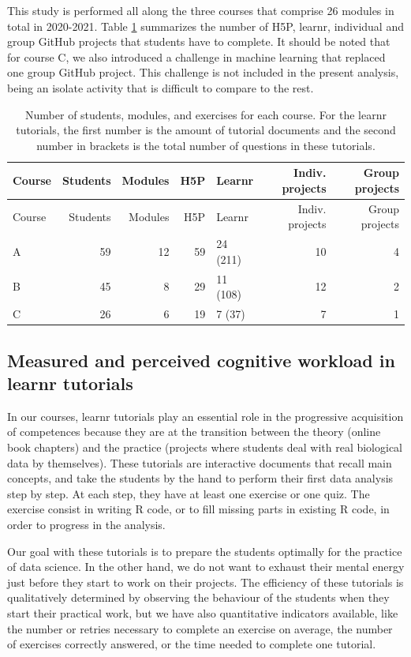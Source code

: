 \documentclass[
]{article}
\begin{document}
This study is performed all along the three courses that comprise 26
modules in total in 2020-2021. Table \ref{tab:tab_course} summarizes the
number of H5P, learnr, individual and group GitHub projects that
students have to complete. It should be noted that for course C, we also
introduced a challenge in machine learning that replaced one group
GitHub project. This challenge is not included in the present analysis,
being an isolate activity that is difficult to compare to the rest.

\begin{longtable}[]{@{}lrrrlrr@{}}
\caption{\label{tab:tab_course} Number of students, modules, and
exercises for each course. For the learnr tutorials, the first number is
the amount of tutorial documents and the second number in brackets is
the total number of questions in these tutorials.}\tabularnewline
\toprule
Course & Students & Modules & H5P & Learnr & Indiv. projects & Group
projects \\
\midrule
\endfirsthead
\toprule
Course & Students & Modules & H5P & Learnr & Indiv. projects & Group
projects \\
\midrule
\endhead
A & 59 & 12 & 59 & 24 (211) & 10 & 4 \\
B & 45 & 8 & 29 & 11 (108) & 12 & 2 \\
C & 26 & 6 & 19 & 7 (37) & 7 & 1 \\
\bottomrule
\end{longtable}

\hypertarget{measured-and-perceived-cognitive-workload-in-learnr-tutorials}{%
\subsection{Measured and perceived cognitive workload in learnr
tutorials}\label{measured-and-perceived-cognitive-workload-in-learnr-tutorials}}

In our courses, learnr tutorials play an essential role in the
progressive acquisition of competences because they are at the
transition between the theory (online book chapters) and the practice
(projects where students deal with real biological data by themselves).
These tutorials are interactive documents that recall main concepts, and
take the students by the hand to perform their first data analysis step
by step. At each step, they have at least one exercise or one quiz. The
exercise consist in writing R code, or to fill missing parts in existing
R code, in order to progress in the analysis.

Our goal with these tutorials is to prepare the students optimally for
the practice of data science. In the other hand, we do not want to
exhaust their mental energy just before they start to work on their
projects. The efficiency of these tutorials is qualitatively determined
by observing the behaviour of the students when they start their
practical work, but we have also quantitative indicators available, like
the number or retries necessary to complete an exercise on average, the
number of exercises correctly answered, or the time needed to complete
one tutorial.
\end{document}
